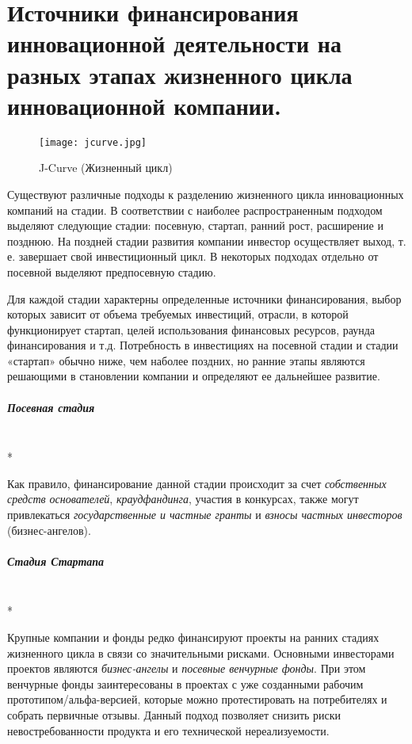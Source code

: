 \documentclass[11pt]{article}
\theoremstyle{plain} %
\theoremstyle{definition} %
\theoremstyle{remark} %
\begin{document}
\section{Источники финансирования инновационной деятельности на разных этапах жизненного цикла инновационной компании.}\label{erste}

\begin{wrapfigure}{r}{0.4\linewidth}
	\texttt{[image: jcurve.jpg]}
	\caption{J-Curve (Жизненный цикл)}
\end{wrapfigure}
Существуют различные подходы к разделению жизненного цикла инновационных компаний на стадии. В соответствии с наиболее распространенным подходом выделяют следующие стадии: посевную, стартап, ранний рост, расширение и позднюю. На поздней стадии развития компании инвестор осуществляет выход, т. е. завершает свой инвестиционный цикл. В некоторых подходах отдельно от посевной выделяют предпосевную стадию.

\vspace{1em}
Для каждой стадии характерны определенные источники финансирования, выбор которых зависит от объема требуемых инвестиций, отрасли, в которой функционирует стартап, целей использования финансовых ресурсов, раунда финансирования и т.д. Потребность в инвестициях на посевной стадии и стадии «стартап» обычно ниже, чем наболее поздних, но ранние этапы являются решающими в становлении компании и определяют ее дальнейшее развитие.

\subparagraph{Посевная стадия} \\*

Как правило, финансирование данной стадии происходит за счет \textit{собственных средств основателей}, \textit{краудфандинга}, участия в конкурсах, также могут привлекаться \textit{государственные и частные гранты} и \textit{взносы частных инвесторов} (бизнес-ангелов).

\subparagraph{Стадия Стартапа} \\*

Крупные компании и фонды редко финансируют проекты на ранних стадиях жизненного цикла в связи со значительными рисками. Основными инвесторами проектов являются \textit{бизнес-ангелы} и \textit{посевные венчурные фонды}. При этом венчурные фонды заинтересованы в проектах с уже созданными рабочим прототипом/альфа-версией, которые можно протестировать на потребителях и собрать первичные отзывы. Данный подход позволяет снизить риски невостребованности продукта и его технической нереализуемости.
\end{document}
